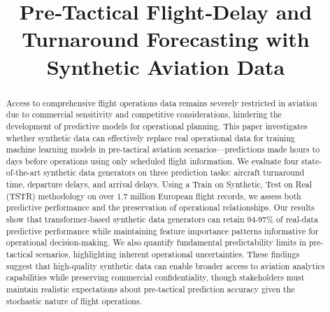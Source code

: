 \documentclass[conference]{IEEEtran}
\begin{document}
\title{Pre‑Tactical Flight‑Delay and Turnaround Forecasting with Synthetic Aviation Data}



\author{
}


\maketitle



\begin{abstract}

    Access to comprehensive flight operations data remains severely restricted in aviation due to commercial sensitivity and competitive considerations, hindering the development of predictive models for operational planning. This paper investigates whether synthetic data can effectively replace real operational data for training machine learning models in pre-tactical aviation scenarios—predictions made hours to days before operations using only scheduled flight information. We evaluate four state-of-the-art synthetic data generators on three prediction tasks: aircraft turnaround time, departure delays, and arrival delays. Using a Train on Synthetic, Test on Real (TSTR) methodology on over 1.7 million European flight records, we assess both predictive performance and the preservation of operational relationships. Our results show that transformer-based synthetic data generators can retain 94-97\% of real-data predictive performance while maintaining feature importance patterns informative for operational decision-making. We also quantify fundamental predictability limits in pre-tactical scenarios, highlighting inherent operational uncertainties. These findings suggest that high-quality synthetic data can enable broader access to aviation analytics capabilities while preserving commercial confidentiality, though stakeholders must maintain realistic expectations about pre-tactical prediction accuracy given the stochastic nature of flight operations.


\end{abstract}
\end{document}
